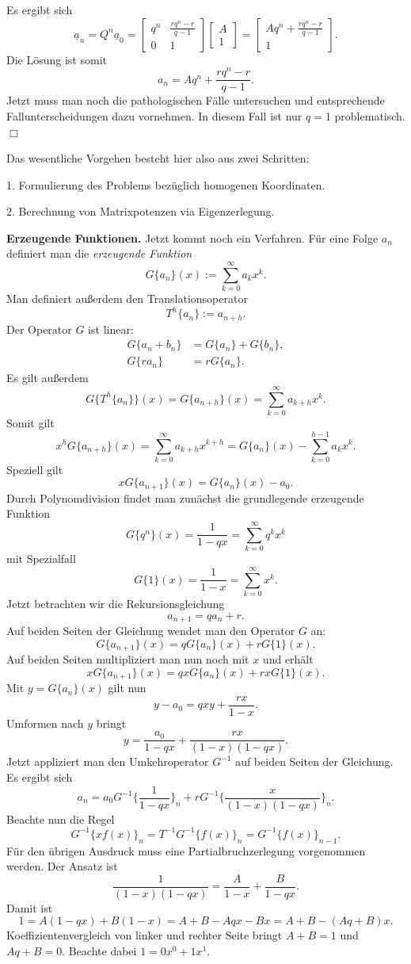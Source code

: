 \documentclass[a4paper,10pt,fleqn,twoside]{scrartcl}
\numberwithin{equation}{section}
\newcommand{\strong}[1]{{\normalfont\sffamily\bfseries #1}}
\theoremstyle{Aufgabe}
\begin{document}
Es ergibt sich
\[\underline a_n = Q^n\underline a_0
= \begin{bmatrix}
q^n & \frac{rq^n-r}{q-1}\\
0 & 1
\end{bmatrix}\begin{bmatrix} A\\ 1\end{bmatrix}
= \begin{bmatrix}
Aq^n + \frac{rq^n-r}{q-1}\\
1\end{bmatrix}.\]
Die Lösung ist somit
\[a_n = Aq^n + \frac{rq^n-r}{q-1}.\]
Jetzt muss man noch die pathologischen Fälle untersuchen und entsprechende
Fallunterscheidungen dazu vornehmen. In diesem Fall ist nur $q=1$
problematisch. $\Box$

Das wesentliche Vorgehen besteht hier also aus zwei Schritten:

1. Formulierung des Problems bezüglich homogenen Koordinaten.

2. Berechnung von Matrixpotenzen via Eigenzerlegung.

\strong{Erzeugende Funktionen.} Jetzt kommt noch ein Verfahren.
Für eine Folge $a_n$ definiert man die \emph{erzeugende Funktion}
\[G\{a_n\}(x) := \sum_{k=0}^\infty a_k x^k.\]
Man definiert außerdem den Translationsoperator
\[T^h\{a_n\} := a_{n+h}.\]
Der Operator $G$ ist linear:
\begin{align*}
G\{a_n+b_n\} &= G\{a_n\}+G\{b_n\},\\
G\{ra_n\} &= rG\{a_n\}.
\end{align*}
Es gilt außerdem
\[G\{T^h\{a_n\}\}(x) = G\{a_{n+h}\}(x)
= \sum_{k=0}^\infty a_{k+h} x^k.\]
Somit gilt
\[x^h G\{a_{n+h}\}(x) = \sum_{k=0}^\infty a_{k+h} x^{k+h}
= G\{a_n\}(x) - \sum_{k=0}^{h-1} a_k x^k.\]
Speziell gilt
\[xG\{a_{n+1}\}(x) = G\{a_n\}(x) - a_0.\]
Durch Polynomdivision findet man zunächst die grundlegende erzeugende Funktion
\[ G\{q^n\}(x) = \frac{1}{1-qx} = \sum_{k=0}^\infty q^k x^k\]
mit Spezialfall
\[ G\{1\}(x) = \frac{1}{1-x} = \sum_{k=0}^\infty x^k.\]
Jetzt betrachten wir die Rekursionsgleichung
\[ a_{n+1} = qa_n+r. \]
Auf beiden Seiten der Gleichung wendet man den Operator $G$ an:
\[ G\{a_{n+1}\}(x) = qG\{a_n\}(x) + rG\{1\}(x).\]
Auf beiden Seiten multipliziert man nun noch mit $x$ und erhält
\[ xG\{a_{n+1}\}(x) = qxG\{a_n\}(x) + rxG\{1\}(x).\]
Mit $y=G\{a_n\}(x)$ gilt nun
\[ y-a_0 = qxy+\frac{rx}{1-x}.\]
Umformen nach $y$ bringt
\[ y = \frac{a_0}{1-qx} + \frac{rx}{(1-x)(1-qx)}.\]
Jetzt appliziert man den Umkehroperator $G^{-1}$ auf beiden Seiten
der Gleichung. Es ergibt sich
\[ a_n = a_0 G^{-1}\bigg\{\frac{1}{1-qx}\bigg\}_n
+ rG^{-1}\bigg\{\frac{x}{(1-x)(1-qx)}\bigg\}_n.\]
Beachte nun die Regel
\[ G^{-1}\{xf(x)\}_n = T^{-1} G^{-1}\{f(x)\}_n = G^{-1}\{f(x)\}_{n-1}.\]
Für den übrigen Ausdruck muss eine Partialbruchzerlegung vorgenommen
werden. Der Ansatz ist
\[ \frac{1}{(1-x)(1-qx)} = \frac{A}{1-x} + \frac{B}{1-qx}.\]
Damit ist
\[ 1 = A(1-qx) + B(1-x) = A+B-Aqx-Bx = A+B-(Aq+B)x.\]
Koeffizientenvergleich von linker und rechter Seite bringt
$A+B=1$ und $Aq+B=0$. Beachte dabei $1=0x^0+1x^1$.
\end{document}
